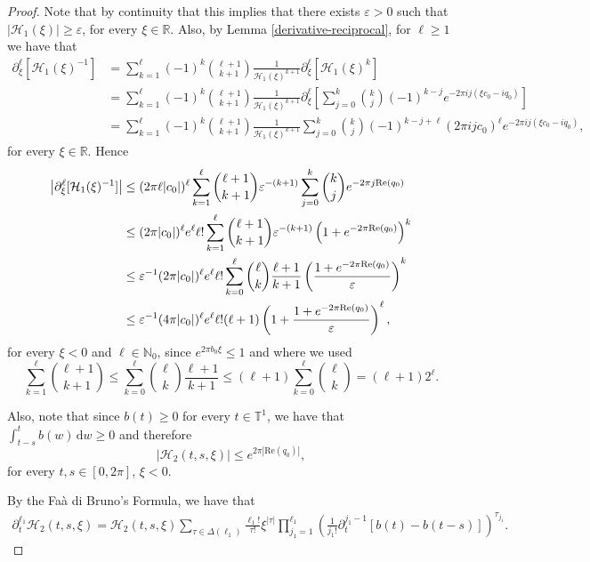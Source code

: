 \documentclass[11pt,reqno]{amsart}
\numberwithin{equation}{section}
\theoremstyle{definition}
\theoremstyle{definition}
\newcommand{\T}{\mathbb{T}}
\newcommand{\R}{\mathbb{R}}
\newcommand{\N}{\mathbb{N}}
\newcommand{\Real}{\mathrm{Re}}
\begin{document}
\begin{proof}
Note that by continuity that this implies that there exists $\varepsilon>0$ such that $|\mathcal{H}_1(\xi)|\geq\varepsilon$, for every $\xi\in\R$. Also, by Lemma \ref{derivative-reciprocal}, for $\ell\geq 1$ we have that
    \begin{align*}
        \partial_\xi^{\ell}[\mathcal{H}_1(\xi)^{-1}]&=\sum_{k=1}^\ell(-1)^k\binom{\ell+1}{k+1}\frac{1}{\mathcal{H}_1(\xi)^{k+1}}\partial_\xi^\ell[\mathcal{H}_1(\xi)^k]\\
        &=\sum_{k=1}^\ell(-1)^k\binom{\ell+1}{k+1}\frac{1}{\mathcal{H}_1(\xi)^{k+1}}\partial_\xi^\ell\left[\sum_{j=0}^k\binom{k}{j}(-1)^{k-j}e^{-2\pi ij(\xi c_0-iq_0)}\right]\\
        &=\sum_{k=1}^\ell(-1)^k\binom{\ell+1}{k+1}\frac{1}{\mathcal{H}_1(\xi)^{k+1}}\sum_{j=0}^k\binom{k}{j}(-1)^{k-j+\ell}(2\pi i j c_0)^\ell e^{-2\pi ij(\xi c_0-iq_0)},
    \end{align*}
for every $\xi\in\R$. Hence 
        \begin{align}
        \left|\partial_\xi^{\ell}[\mathcal{H}_1(\xi)^{-1}]\right| & \leq(2\pi \ell |c_0|)^\ell\sum_{k=1}^\ell\binom{\ell+1}{k+1}\varepsilon^{-(k+1)}\sum_{j=0}^k\binom{k}{j} e^{-2\pi j \Real(q_0)} \notag \\
        &\leq (2\pi |c_0|)^\ell e^\ell \ell!\sum_{k=1}^\ell\binom{\ell+1}{k+1}\varepsilon^{-(k+1)}\left(1+e^{-2\pi  \Real(q_0)}\right)^k \notag \\
        &\leq \varepsilon^{-1}(2\pi |c_0|)^\ell e^\ell \ell!\sum_{k=0}^{\ell}\binom{\ell}{k}\frac{\ell+1}{k+1}\left(\frac{1+e^{-2\pi  \Real(q_0)}}{\varepsilon}\right)^k \notag \\
        & \leq \varepsilon^{-1}(4\pi |c_0|)^\ell e^\ell \ell!(\ell+1)\left(1+\frac{1+e^{-2\pi  \Real(q_0)}}{\varepsilon}\right)^\ell, \label{H1}
    \end{align}
    for every $\xi<0$ and $\ell\in\N_0$, since $e^{2\pi b_0\xi}\leq 1$ and where we used
    \[\sum_{k=1}^{\ell}\binom{\ell+1}{k+1}\leq \sum_{k=0}^{\ell}\binom{\ell}{k}\frac{\ell+1}{k+1}\leq (\ell+1)\sum_{k=0}^{\ell}\binom{\ell}{k} = (\ell+1)2^\ell.\]
    
    Also, note that since $b(t)\geq 0$ for every $t\in\T^1$, we have that $\int_{t-s}^tb(w)\,\mathrm{d}w\geq 0$ and therefore
    \begin{equation*}
        |\mathcal{H}_2(t,s,\xi)|\leq e^{2\pi|\Real(q_0)|},
    \end{equation*}
for every $t,s\in [0,2\pi]$, $\xi<0$.
    
By the Fa\`a di Bruno's Formula, we have that
    \begin{align}\label{H2_1}
    \partial_t^{\ell_1}\mathcal{H}_2(t,s,\xi) = \mathcal{H}_2(t,s,\xi)\sum_{\tau\in\Delta(\ell_1)}\frac{\ell_1!}{\tau!}\xi^{|\tau|}\prod_{j_1=1}^{\ell_1}\left(\frac{1}{j_1!}\partial_t^{j_1-1}[b(t)-b(t-s)]\right)^{\tau_{j_1}}. 
    \end{align}
    

\end{proof}
\end{document}
